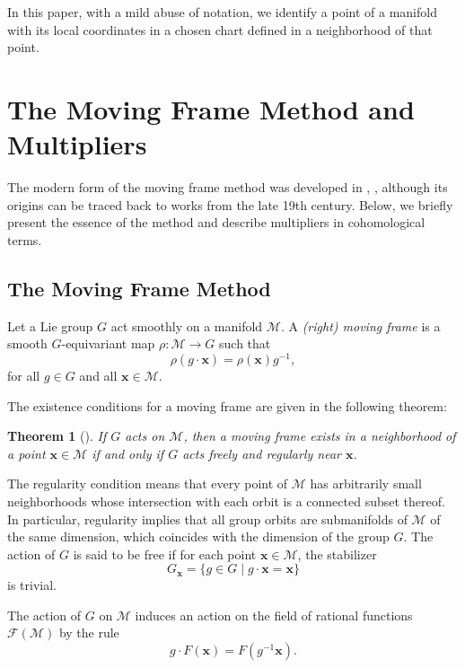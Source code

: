 \documentclass[12pt,reqno]{amsart}
\newtheorem{theorem}{Theorem}
\begin{document}
In this paper, with a mild abuse of notation, we identify a point of a manifold with its local coordinates in a
chosen chart defined in a neighborhood of that point.




\section{The Moving Frame Method and Multipliers}

The modern form of the moving frame method was developed in \cite{Olver1998}, \cite{Olver1999-1}, although its origins can be traced back to works from the late 19th century. Below, we briefly present the essence of the method and describe multipliers in cohomological terms.

\subsection{The Moving Frame Method}

Let a Lie group $G$ act smoothly on a manifold $\mathcal M.$ A \textit{(right) moving frame} is a smooth $G$-equivariant map $\rho: \mathcal M \to G$ such that
$$
\rho(g \cdot \boldsymbol x) = \rho(\boldsymbol x) g^{-1},
$$
for all $g \in G$ and all $\boldsymbol x \in \mathcal M$.

The existence conditions for a moving frame are given in the following theorem:

\begin{theorem}[\cite{Olver1999-1}]\label{mt}
If $G$ acts on $\mathcal M$, then a moving frame exists in a neighborhood of
a point $\boldsymbol x \in \mathcal M$ if and only if $G$ acts freely and regularly near $\boldsymbol x$.
\end{theorem}

The regularity condition means that every point of $\mathcal M$ has arbitrarily small neighborhoods whose intersection with each orbit is a connected subset thereof. In particular, regularity implies that all group orbits are submanifolds of $\mathcal M$ of the same dimension, which coincides with the dimension of the group $G$. The action of $G$ is said to be free if for each point $\boldsymbol x \in \mathcal M$, the stabilizer  
$$
G_{\boldsymbol x} = \{g \in G \mid g \cdot \boldsymbol x = \boldsymbol x \}
$$ 
is trivial.

The action of $G$ on $\mathcal M$ induces an action on the field of rational functions $\mathcal{F}(\mathcal M)$ by the rule
$$
g \cdot F(\boldsymbol x) = F(g^{-1} \boldsymbol x).
$$
\end{document}
